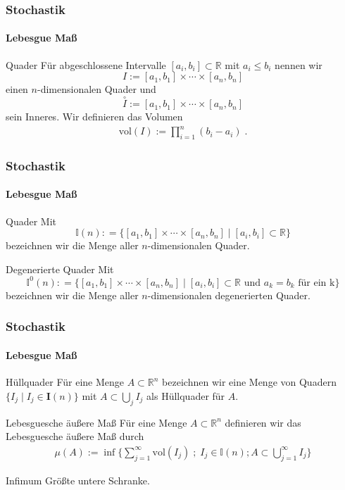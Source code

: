 \documentclass{beamer}
\begin{document}
\begin{frame}
    \frametitle{Stochastik}
\framesubtitle{Lebesgue Maß}
    \begin{block}{Quader}
Für abgeschlossene Intervalle $[a_i,b_i] \subset \mathbb{R}$ mit $a_i \leq b_i$ nennen wir 
$$I := [a_1,b_1] \times \cdots \times [a_n,b_n]$$ 
einen $n$-dimensionalen Quader und 
$$\overset{\circ}{I}:= [a_1, b_1] \times \cdots \times [a_n,b_n]$$
 sein Inneres. Wir definieren das Volumen 
\begin{align*}
\text{vol} (I):=   \prod_{i = 1}^n (b_i -a_i)  \; .
\end{align*}

\end{block}
 \end{frame}



\begin{frame}
    \frametitle{Stochastik}
\framesubtitle{Lebesgue Maß}
    \begin{block}{Quader}
Mit $$\mathbb{I}(n): = \{   [a_1,b_1] \times \cdots \times [a_n,b_n] \; | \;  [a_i, b_i] \subset \mathbb{R} \}$$ bezeichnen wir die Menge aller $n$-dimensionalen Quader. 
\end{block}
    \begin{block}{Degenerierte Quader}
Mit $$\mathbb{I}^0(n): = \{   [a_1,b_1] \times \cdots \times [a_n,b_n] \; | \;  [a_i, b_i] \subset \mathbb{R}  \text { und } a_k = b_k \text{ für ein k}\}$$ bezeichnen wir die Menge aller $n$-dimensionalen degenerierten Quader. 
\end{block}
 
 \end{frame}



\begin{frame}
    \frametitle{Stochastik}
\framesubtitle{Lebesgue Maß}

    \begin{block}{Hüllquader}
Für eine Menge $A \subset \mathbb{R}^n$ bezeichnen wir eine Menge von Quadern $\{ I_j \; | \;  I_j \in \mathbf{I}(n)  \}$ mit $A \subset \bigcup_j I_j$ als Hüllquader für $A$.
\end{block}

    \begin{block}{ Lebesguesche äußere Maß}
Für eine Menge $A \subset \mathbb{R}^n$ definieren wir das Lebesguesche äußere Maß durch 
\begin{align*}
\mu (A):=   \inf \biggl \{ \sum_{j=1}^{\infty}   \text{vol} (I_j)\; ; \; I_j \in \mathbb{I}(n); A \subset \bigcup_{j= 1}^{\infty} I_j \biggr \} 
\end{align*}
\end{block}
    \begin{block}{Infimum}
Größte untere Schranke.
\end{block}
 \end{frame}
\end{document}
